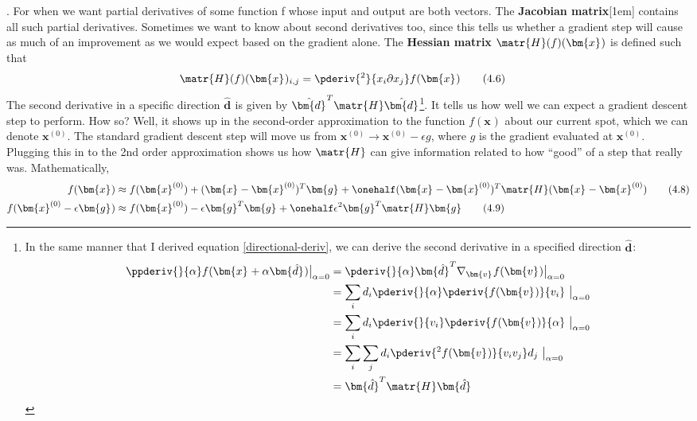 \documentclass[11pt]{article}
\renewcommand\vec[2][]{\bm{#2}_{#1}}
\newcommand\myspace[1][]{\vspace{#1\bigskipamount}}
\newcommand\p{\Needspace{10\baselineskip} \noindent}
\newcommand\tlab[1]{\tag{#1}\label{#1}}
\begin{document}
\myspace
\p {}. For when we want partial derivatives of some function f whose input and output are both vectors. The \textbf{Jacobian matrix}\marginnote{$\matr{J} \in \R^{n \times m}$ where $J_{i,j} = \pderiv{}{x_j} f(\vec{x})_i$}[1em] contains all such partial derivatives. Sometimes we want to know about second derivatives too, since this tells us whether a gradient step will cause as much of an improvement as we would expect based on the gradient alone. The \textbf{Hessian matrix} $\matr{H}(f)(\vec{x})$ is defined such that 
\begin{align}
\matr{H}(f)(\vec{x})_{i,j} &= \pderiv{^2}{x_i\partial x_j} f(\vec{x}) \tlab{4.6}
\end{align}
The second derivative in a specific direction $\vec{\hat{d}}$ is given by $\hat{\vec{d}}^T \matr{H} \hat{\vec{d}}$\footnote{
	In the same manner that I derived equation \ref{directional-deriv}, we can derive the second derivative in a specified direction $\vec{\hat d}$:
	\begin{align}
		\ppderiv{}{\alpha} f(\vec{x} + \alpha \vec{\hat d}) \big|_{\alpha=0}
		&= \pderiv{}{\alpha} \vec{\hat d}^T \nabla_{\vec{v}} f(\vec{v}) \big|_{\alpha=0} \\
		&= \sum_i d_i \pderiv{}{\alpha} \pderiv{f(\vec v)}{v_i} ~ \big|_{\alpha=0} \\
		&= \sum_i d_i \pderiv{}{v_i} \pderiv{f(\vec v)}{\alpha} ~ \big|_{\alpha=0} \\
		&= \sum_i \sum_j d_i \pderiv{^2f(\vec v) }{v_i v_j} d_j ~ \big|_{\alpha=0} \\
		&= \vec{\hat d}^T \matr{H} \vec{\hat d}
	\end{align}
}. It tells us how well we can expect a gradient descent step to perform. How so? Well, it shows up in the second-order approximation to the function $f(\vec{x})$ about our current spot, which we can denote $\vec{x}^{(0)}$. The standard gradient descent step will move us from $\vec{x}^{(0)} \rightarrow \vec{x}^{(0)} - \epsilon g$, where $g$ is the gradient evaluated at $\vec{x}^{(0)}$. Plugging this in to the 2nd order approximation shows us how $\matr{H}$ can give information related to how ``good'' of a step that really was. Mathematically, 
\begin{align}
	f(\vec{x}) &\approx f(\vec{x}^{(0)}) + (\vec{x} - \vec{x}^{(0)})^T \vec{g} + \onehalf (\vec{x} - \vec{x}^{(0)})^T \matr{H} (\vec{x} - \vec{x}^{(0)}) \tlab{4.8} \\
	f(\vec{x}^{(0)} - \epsilon \vec{g}) &\approx f(\vec{x}^{(0)}) - \epsilon \vec{g}^T\vec{g} + \onehalf \epsilon^2 \vec{g}^T \matr{H} \vec{g} \tlab{4.9}
\end{align}
\end{document}
